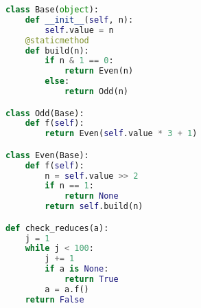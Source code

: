 \begin{lstlisting}[language=Python]
class Base(object):
    def __init__(self, n):
        self.value = n
    @staticmethod
    def build(n):
        if n & 1 == 0:
            return Even(n)
        else:
            return Odd(n)

class Odd(Base):
    def f(self):
        return Even(self.value * 3 + 1)

class Even(Base):
    def f(self):
        n = self.value >> 2
        if n == 1:
            return None
        return self.build(n)

def check_reduces(a):
    j = 1
    while j < 100:
        j += 1
        if a is None:
            return True
        a = a.f()
    return False
\end{lstlisting}
